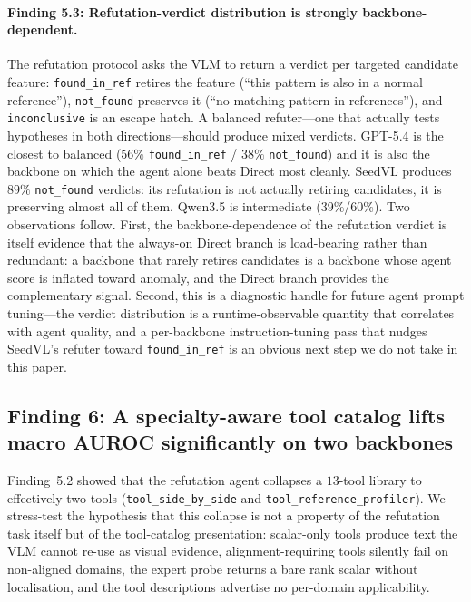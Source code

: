 \paragraph{Finding 5.3: Refutation-verdict distribution is strongly backbone-dependent.}
The refutation protocol asks the VLM to return a verdict per targeted candidate feature: \texttt{found\_in\_ref} retires the feature (``this pattern is also in a normal reference''), \texttt{not\_found} preserves it (``no matching pattern in references''), and \texttt{inconclusive} is an escape hatch. A balanced refuter---one that actually tests hypotheses in both directions---should produce mixed verdicts. GPT-5.4 is the closest to balanced ($56\%$ \texttt{found\_in\_ref} / $38\%$ \texttt{not\_found}) and it is also the backbone on which the agent alone beats Direct most cleanly. SeedVL produces $89\%$ \texttt{not\_found} verdicts: its refutation is not actually retiring candidates, it is preserving almost all of them. Qwen3.5 is intermediate ($39\%$/$60\%$). Two observations follow. First, the backbone-dependence of the refutation verdict is itself evidence that the always-on Direct branch is load-bearing rather than redundant: a backbone that rarely retires candidates is a backbone whose agent score is inflated toward anomaly, and the Direct branch provides the complementary signal. Second, this is a diagnostic handle for future agent prompt tuning---the verdict distribution is a runtime-observable quantity that correlates with agent quality, and a per-backbone instruction-tuning pass that nudges SeedVL's refuter toward \texttt{found\_in\_ref} is an obvious next step we do not take in this paper.

\subsection{Finding 6: A specialty-aware tool catalog lifts macro AUROC significantly on two backbones}
\label{ssec:finding6}

Finding~5.2 showed that the refutation agent collapses a $13$-tool
library to effectively two tools (\texttt{tool\_side\_by\_side} and
\texttt{tool\_reference\_profiler}). We stress-test the hypothesis that this
collapse is not a property of the refutation task itself but of the
tool-catalog presentation: scalar-only tools produce text the VLM cannot
re-use as visual evidence, alignment-requiring tools silently fail on
non-aligned domains, the expert probe returns a bare rank scalar without
localisation, and the tool descriptions advertise no per-domain applicability.

